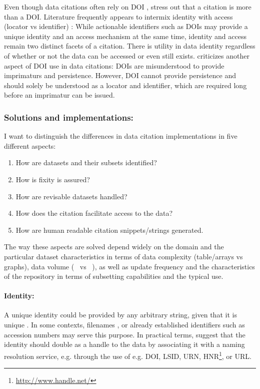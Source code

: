 \documentclass[a4paper,10pt]{article}
\begin{document}
Even though data citations often rely on \gls{DOI} \citep{Castelli2013}, \cite{Buneman2010} stress out that a citation is more than a \gls{DOI}.
Literature frequently appears to intermix identity with access (locator vs identifier) \citep{ESIP2012a}: While actionable identifiers such as \glspl{DOI} may provide a unique identity and an access mechanism at the same time, identity and access remain two distinct facets of a citation. There is utility in data identity regardless of whether or not the data can be accessed or even still exists.
\Cite{Parsons2013a} criticizes another aspect of \gls{DOI} use in data citations: \Glspl{DOI} are misunderstood to provide imprimaturs and persistence. However, \gls{DOI} cannot provide persistence and should solely be understood as a locator and identifier, which are required long before an imprimatur can be issued.

\newpage
\subsubsection{Solutions and implementations:}
I want to distinguish the differences in data citation implementations in five different aspects:

\begin{enumerate}
 \item How are datasets and their subsets identified? 
 \item How is fixity is assured? 
 \item How are revisable datasets handled? 
 \item How does the citation facilitate access to the data? 
 \item How are human readable citation snippets/strings generated.
\end{enumerate}

The way these aspects are solved depend widely on the domain and the particular dataset characteristics in terms of data complexity (table/arrays vs graphs), data volume (\si{\kilo\byte} vs \si{\peta\byte}), as well as update frequency and the characteristics of the repository in terms of subsetting capabilities and the typical use.

\paragraph{Identity:}
A unique identity could be provided by any arbitrary string, given that it is unique \citep{CODATA2013}. In some contexts, filenames \citep{Buneman2016}, or already established identifiers such as accession numbers \citep{Bandrowski2016} may serve this purpose. 
In practical terms, \cite{AltKin07} suggest that the identity should double as a handle to the data by associating it with a naming resolution service, e.g. through the use of e.g. \gls{DOI},  \gls{LSID}, \gls{URN}, \gls{HNR}\footnote{\url{http://www.handle.net/}}, or \gls{URL}. 
\end{document}
